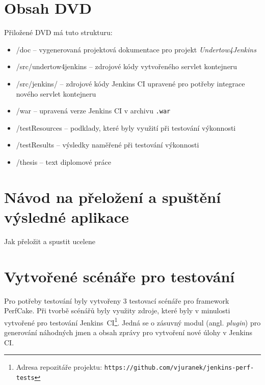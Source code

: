 
\chapter{Obsah DVD}
    Přiložené DVD má tuto strukturu:
    \begin{itemize}
        \item /doc -- vygenerovaná projektová dokumentace pro projekt \emph{Undertow4Jenkins}
        \item /src/undertow4jenkins -- zdrojové kódy vytvořeného servlet kontejneru
        \item /src/jenkins/ -- zdrojové kódy Jenkins CI upravené pro potřeby integrace nového servlet kontejneru
        \item /war -- upravená verze Jenkins CI v archivu \texttt{.war} 
        \item /testResources -- podklady, které byly využití při testování výkonnosti
        \item /testResults -- výsledky naměřené při testování výkonnosti
        \item /thesis -- text diplomové práce
    \end{itemize}


\chapter{Návod na přeložení a spuštění výsledné aplikace}
    Jak přeložit a spustit ucelene



\chapter{Vytvořené scénáře pro testování} \label{prilohaScenare}
    Pro potřeby testování byly vytvořeny 3 testovací scénáře pro framework PerfCake. 
    Při tvorbě scénářů byly využity zdroje, které byly v minulosti vytvořené pro testování 
    Jenkins~CI\footnote{Adresa repozitáře projektu: 
    \texttt{https://github.com/vjuranek/jenkins-perf-tests}}.
    Jedná se o zásuvný modul (angl. \emph{plugin}) pro 
    generování náhodných jmen a obsah zprávy pro vytvoření nové úlohy v Jenkins CI. 


